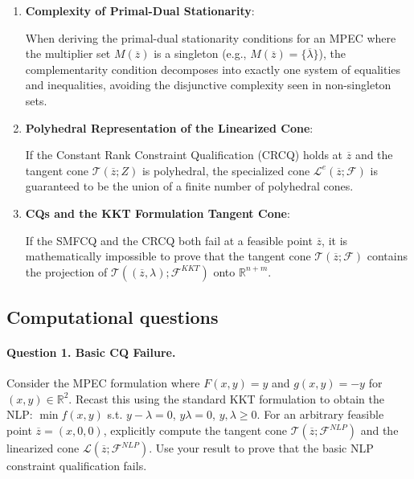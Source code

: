 \documentclass[pdflatex,sn-mathphys-num]{sn-jnl}%
\theoremstyle{definition}
\begin{document}
\begin{enumerate}[label=(\roman*)]
For any given direction $dx \in \mathbb{R}^n$ and multiplier $\lambda \in M(\overline{z})$, the directional critical set $\mathcal{K}(\overline{z},\lambda;dx)$ is non-empty if and only if $\lambda$ belongs to the set of critical multipliers $M^c(\overline{z};dx)$.

\item \textbf{Complexity of Primal-Dual Stationarity}:

When deriving the primal-dual stationarity conditions for an MPEC where the multiplier set $M(\overline{z})$ is a singleton (e.g., $M(\overline{z}) = \{\overline{\lambda}\}$), the complementarity condition decomposes into exactly one system of equalities and inequalities, avoiding the disjunctive complexity seen in non-singleton sets.

\item \textbf{Polyhedral Representation of the Linearized Cone}:

If the Constant Rank Constraint Qualification (CRCQ) holds at $\overline{z}$ and the tangent cone $\mathcal{T}(\overline{z};Z)$ is polyhedral, the specialized cone $\mathcal{L}^e(\overline{z};\mathcal{F})$ is guaranteed to be the union of a finite number of polyhedral cones.

\item \textbf{CQs and the KKT Formulation Tangent Cone}:

If the SMFCQ and the CRCQ both fail at a feasible point $\overline{z}$, it is mathematically impossible to prove that the tangent cone $\mathcal{T}(\overline{z};\mathcal{F})$ contains the projection of $\mathcal{T}((\overline{z},\lambda);\mathcal{F}^{KKT})$ onto $\mathbb{R}^{n+m}$.
\end{enumerate}

\subsection{Computational questions}
\paragraph{Question 1. Basic CQ Failure.}
Consider the MPEC formulation where $F(x,y) = y$ and $g(x,y) = -y$ for $(x,y) \in \mathbb{R}^2$. Recast this using the standard KKT formulation to obtain the NLP: $\min f(x,y)$ s.t. $y-\lambda=0$, $y\lambda=0$, $y,\lambda \ge 0$. 
    For an arbitrary feasible point $\overline{z} = (x,0,0)$, explicitly compute the tangent cone $\mathcal{T}(\overline{z}; \mathcal{F}^{NLP})$ and the linearized cone $\mathcal{L}(\overline{z}; \mathcal{F}^{NLP})$. Use your result to prove that the basic NLP constraint qualification fails.
\end{document}
